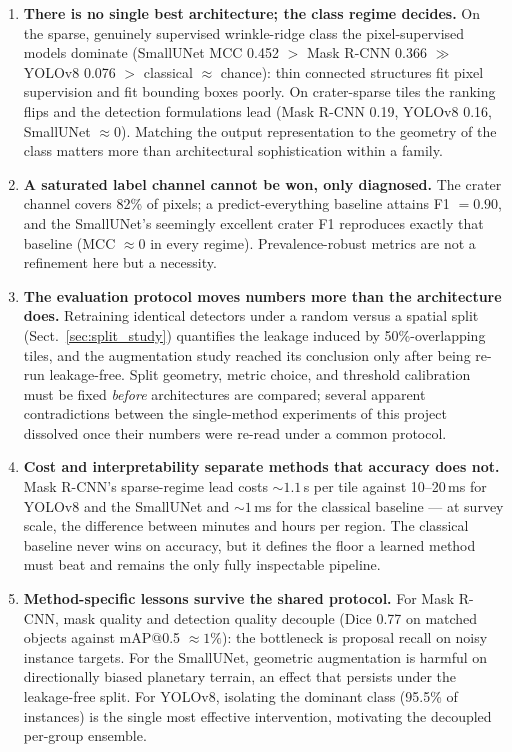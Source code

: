 \documentclass{aa}
\begin{document}
\begin{enumerate}
    \item \textbf{There is no single best architecture; the class regime decides.} On the sparse, genuinely supervised wrinkle-ridge class the pixel-supervised models dominate (SmallUNet MCC 0.452 $>$ Mask R-CNN 0.366 $\gg$ YOLOv8 0.076 $>$ classical $\approx$ chance): thin connected structures fit pixel supervision and fit bounding boxes poorly. On crater-sparse tiles the ranking flips and the detection formulations lead (Mask R-CNN 0.19, YOLOv8 0.16, SmallUNet $\approx0$). Matching the output representation to the geometry of the class matters more than architectural sophistication within a family.

    \item \textbf{A saturated label channel cannot be won, only diagnosed.} The crater channel covers 82\% of pixels; a predict-everything baseline attains F1 $=0.90$, and the SmallUNet's seemingly excellent crater F1 reproduces exactly that baseline (MCC $\approx0$ in every regime). Prevalence-robust metrics are not a refinement here but a necessity.

    \item \textbf{The evaluation protocol moves numbers more than the architecture does.} Retraining identical detectors under a random versus a spatial split (Sect.~\ref{sec:split_study}) quantifies the leakage induced by 50\%-overlapping tiles, and the augmentation study reached its conclusion only after being re-run leakage-free. Split geometry, metric choice, and threshold calibration must be fixed \emph{before} architectures are compared; several apparent contradictions between the single-method experiments of this project dissolved once their numbers were re-read under a common protocol.

    \item \textbf{Cost and interpretability separate methods that accuracy does not.} Mask R-CNN's sparse-regime lead costs ${\sim}1.1$\,s per tile against 10--20\,ms for YOLOv8 and the SmallUNet and ${\sim}1$\,ms for the classical baseline --- at survey scale, the difference between minutes and hours per region. The classical baseline never wins on accuracy, but it defines the floor a learned method must beat and remains the only fully inspectable pipeline.

    \item \textbf{Method-specific lessons survive the shared protocol.} For Mask R-CNN, mask quality and detection quality decouple (Dice 0.77 on matched objects against mAP@0.5 $\approx1\%$): the bottleneck is proposal recall on noisy instance targets. For the SmallUNet, geometric augmentation is harmful on directionally biased planetary terrain, an effect that persists under the leakage-free split. For YOLOv8, isolating the dominant class (95.5\% of instances) is the single most effective intervention, motivating the decoupled per-group ensemble.


\end{enumerate}
\end{document}
